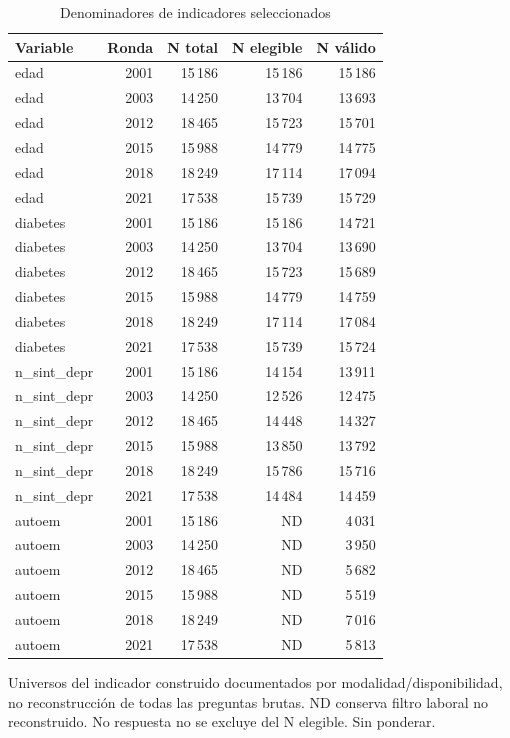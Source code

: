 \begin{table}[!htbp]
\centering
\caption{Denominadores de indicadores seleccionados}\label{tab:eda-simple-universos}
\small\setlength{\tabcolsep}{4pt}
\renewcommand{\arraystretch}{1.15}
\begin{tabular}{lrrrr}
\toprule
\textbf{Variable} & \textbf{Ronda} & \textbf{N total} & \textbf{N elegible} & \textbf{N válido} \\
\midrule
edad & 2001 & 15\,186 & 15\,186 & 15\,186 \\
edad & 2003 & 14\,250 & 13\,704 & 13\,693 \\
edad & 2012 & 18\,465 & 15\,723 & 15\,701 \\
edad & 2015 & 15\,988 & 14\,779 & 14\,775 \\
edad & 2018 & 18\,249 & 17\,114 & 17\,094 \\
edad & 2021 & 17\,538 & 15\,739 & 15\,729 \\
diabetes & 2001 & 15\,186 & 15\,186 & 14\,721 \\
diabetes & 2003 & 14\,250 & 13\,704 & 13\,690 \\
diabetes & 2012 & 18\,465 & 15\,723 & 15\,689 \\
diabetes & 2015 & 15\,988 & 14\,779 & 14\,759 \\
diabetes & 2018 & 18\,249 & 17\,114 & 17\,084 \\
diabetes & 2021 & 17\,538 & 15\,739 & 15\,724 \\
n\_sint\_depr & 2001 & 15\,186 & 14\,154 & 13\,911 \\
n\_sint\_depr & 2003 & 14\,250 & 12\,526 & 12\,475 \\
n\_sint\_depr & 2012 & 18\,465 & 14\,448 & 14\,327 \\
n\_sint\_depr & 2015 & 15\,988 & 13\,850 & 13\,792 \\
n\_sint\_depr & 2018 & 18\,249 & 15\,786 & 15\,716 \\
n\_sint\_depr & 2021 & 17\,538 & 14\,484 & 14\,459 \\
autoem & 2001 & 15\,186 & ND & 4\,031 \\
autoem & 2003 & 14\,250 & ND & 3\,950 \\
autoem & 2012 & 18\,465 & ND & 5\,682 \\
autoem & 2015 & 15\,988 & ND & 5\,519 \\
autoem & 2018 & 18\,249 & ND & 7\,016 \\
autoem & 2021 & 17\,538 & ND & 5\,813 \\
\bottomrule
\end{tabular}
\par\medskip
\parbox{\linewidth}{\footnotesize Universos del indicador construido documentados por modalidad/disponibilidad, no reconstrucción de todas las preguntas brutas. ND conserva filtro laboral no reconstruido. No respuesta no se excluye del N elegible. Sin ponderar.}
\end{table}
